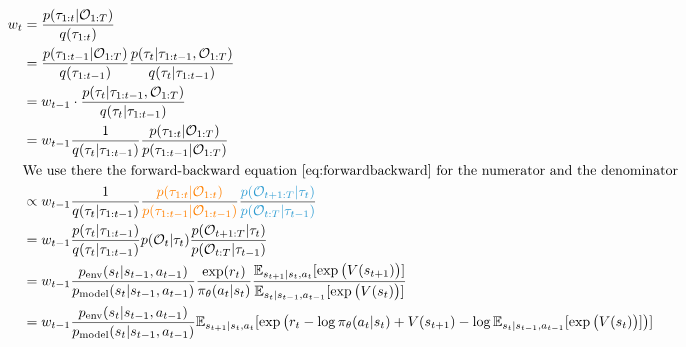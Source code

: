 \label{app:rec_weights}
\begin{align}
w_t &= \frac{p(\traj_{1:t} | \gO_{1:T})}{q(\traj_{1:t})} \nonumber\\
&= \frac{p(\traj_{1:t-1} | \gO_{1:T})}{q(\traj_{1:t-1})}\frac{p(\traj_t |\traj_{1:t-1}, \gO_{1:T})}{q(\traj_t | \traj_{1:t-1})} \nonumber\\
&= w_{t-1} \cdot \frac{p(\traj_t |\traj_{1:t-1}, \gO_{1:T})}{q(\traj_t | \traj_{1:t-1})} \nonumber\\
&= w_{t-1} \frac{1}{ q(\traj_t | \traj_{1:t-1})} \frac{p(\traj_{1:t} | \gO_{1:T})}{ p(\traj_{1:t-1} | \gO_{1:T})} \nonumber\\
&\text{We use there the forward-backward equation~\ref{eq:forwardbackward} for the numerator and the denominator} \nonumber\\
 &\propto w_{t-1}   \frac{1}{ q(\traj_t | \traj_{1:t-1})} \frac{ \textcolor{orange}{p(\traj_{1:t} | \gO_{1:t})}}{ \textcolor{orange}{p(\traj_{1:t-1} | \gO_{1:t-1})}} \frac{ \textcolor{beta}{p(\gO_{t+1:T} | \traj_{t})}}{ \textcolor{beta}{p(\gO_{t:T} | \traj_{t-1})}}   \nonumber\\
&= w_{t-1}   \frac{ p(\traj_t | \traj_{1:t-1})}{ q(\traj_t | \traj_{1:t-1})}  p(\gO_t | \traj_t)   \frac{ p(\gO_{t+1:T} | \traj_{t})}{ p(\gO_{t:T} | \traj_{t-1})}  \nonumber\\
&= w_{t-1}    \frac{\penv(s_{t} | s_{t-1}, a_{t-1})}{ \pmodel(s_{t} | s_{t-1}, a_{t-1}) }   \frac{\exp (r_t)}{\pi_\parampol(a_t|s_t)} \frac{\E_{s_{t+1} | s_t, a_t} [ \exp \big( V(s_{t+1}) \big)] }{\E_{s_{t} | s_{t-1}, a_{t-1}} [ \exp \big( V(s_{t}) \big)]}  \nonumber\\
&= w_{t-1} \frac{\penv(s_{t} | s_{t-1}, a_{t-1})}{ \pmodel(s_{t} | s_{t-1}, a_{t-1}) }  \E_{s_{t+1} | s_t, a_t} [ \exp \big( r_t  -  \log \pi_\parampol(a_t | s_t) + V(s_{t+1}) - \log \E_{s_{t} | s_{t-1}, a_{t-1}} [ \exp \big( V(s_{t}) \big)] \big)]
\end{align}



